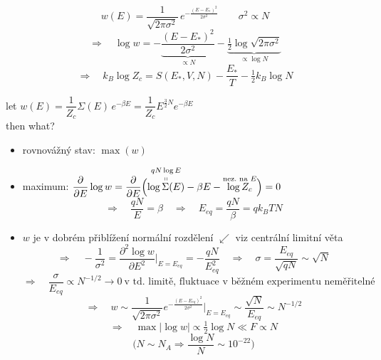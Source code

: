 {\color{gray}
\[
  w(E) = \frac{1}{\sqrt{2\pi\sigma^2}}\,e^{-\frac{(E - E_*)^2}{2\sigma^2}} \qquad \sigma^2\propto N
\]
\[
  \Rightarrow\quad \log w = -\underbrace{\frac{(E - E_*)^2}{2\sigma^2}}_{\propto N} - \underbrace{\tfrac12\log\sqrt{2\pi\sigma^2}}_{\propto\log N}
\]
\[
  \Rightarrow\quad k_B\log Z_c = S(E_*,V,N) - \frac{E_*}{T} - \tfrac12k_B\log N
\]

let \quad $w(E) = \dfrac{1}{Z_c}\Sigma(E)\,e^{-\beta E} = \dfrac{1}{Z_c}E^{\frac32N}e^{-\beta E}$ \\
then what?
\begin{itemize}
  \item rovnovážný stav: $\max(w)$
  \item maximum: \quad $\displaystyle\pdv{E}\log w = \pdv{E}\Big(\overset{qN\log E}{\overset{\shortparallel}{\log\Sigma(E)}} - \beta E - \overset{\text{nez.\ na } E}{\log Z_c}\Big) = 0$
  \[
    \Rightarrow\quad \frac{qN}{E} = \beta \quad\Rightarrow\quad E_{eq} = \frac{qN}{\beta} = qk_BTN
  \]
  \item $w$ je v dobrém přiblížení normální rozdělení \hfill \textcolor{NavyBlue}{$\swarrow$ viz centrální limitní věta}
  \[
    \Rightarrow\quad -\frac{1}{\sigma^2} = \frac{\partial^2\log w}{\partial E^2}\Big|_{E = E_{eq}} = -\frac{qN}{E_{eq}^2}
    \quad\Rightarrow\quad \sigma = \frac{E_{eq}}{\sqrt{qN}}\sim\sqrt N
  \]
  \[
    \Rightarrow\quad \frac{\sigma}{E_{eq}}\propto N^{-1/2}\to 0 \ \text{v td.\ limitě, fluktuace v běžném experimentu neměřitelné}
  \]
  \[
    \Rightarrow\quad w\sim\frac{1}{\sqrt{2\pi\sigma^2}}e^{-\frac{(E - E_{eq})^2}{2\sigma^2}}\Big|_{E = E_{eq}}\sim\frac{\sqrt N}{E_{eq}}\sim N^{-1/2}
  \]
  \[
    \Rightarrow\quad \max|\log w|\propto\tfrac12\log N\ll F\propto N
  \]
  \[
    \Big(N\sim N_A \Rightarrow \frac{\log N}{N}\sim 10^{-22}\Big)
  \]
\end{itemize}
}

